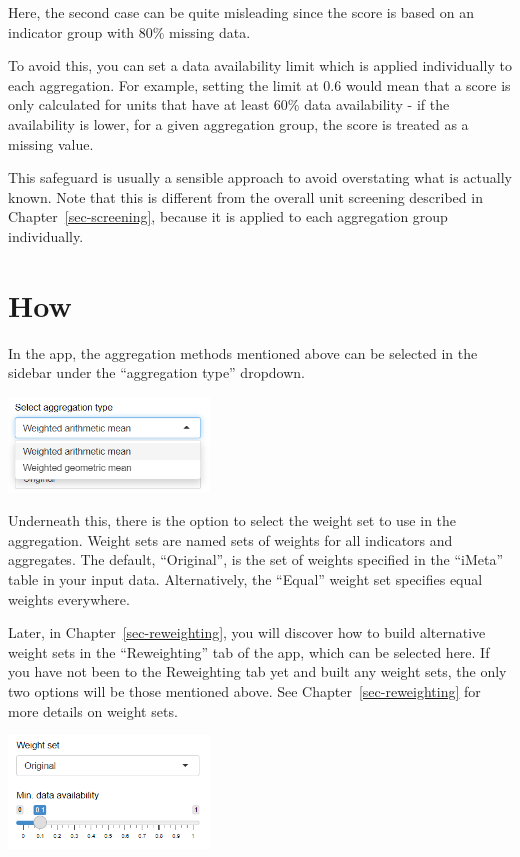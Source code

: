 \documentclass[
  letterpaper,
  DIV=11,
  numbers=noendperiod]{scrreprt}
\begin{document}
Here, the second case can be quite misleading since the score is based
on an indicator group with 80\% missing data.

To avoid this, you can set a data availability limit which is applied
individually to each aggregation. For example, setting the limit at 0.6
would mean that a score is only calculated for units that have at least
60\% data availability - if the availability is lower, for a given
aggregation group, the score is treated as a missing value.

This safeguard is usually a sensible approach to avoid overstating what
is actually known. Note that this is different from the overall unit
screening described in Chapter~\ref{sec-screening}, because it is
applied to each aggregation group individually.

\hypertarget{how-4}{%
\section{How}\label{how-4}}

In the app, the aggregation methods mentioned above can be selected in
the sidebar under the ``aggregation type'' dropdown.

\includegraphics[width=0.4\textwidth,height=\textheight]{figs/compose_1.png}

Underneath this, there is the option to select the weight set to use in
the aggregation. Weight sets are named sets of weights for all
indicators and aggregates. The default, ``Original'', is the set of
weights specified in the ``iMeta'' table in your input data.
Alternatively, the ``Equal'' weight set specifies equal weights
everywhere.

Later, in Chapter~\ref{sec-reweighting}, you will discover how to build
alternative weight sets in the ``Reweighting'' tab of the app, which can
be selected here. If you have not been to the Reweighting tab yet and
built any weight sets, the only two options will be those mentioned
above. See Chapter~\ref{sec-reweighting} for more details on weight
sets.

\includegraphics[width=0.4\textwidth,height=\textheight]{figs/compose_2.png}
\end{document}
